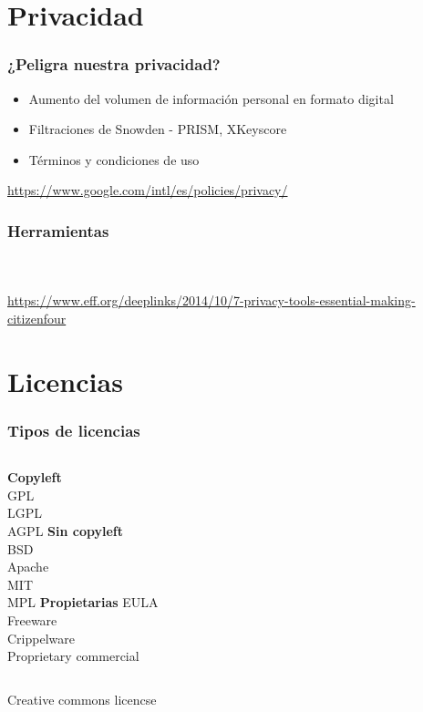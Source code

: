 \documentclass{beamer}
\begin{document}
\section{Privacidad}

\begin{frame}
\end{frame}

\begin{frame}\frametitle{¿Peligra nuestra privacidad?}
	\begin{itemize}
        \item Aumento del volumen de información personal en formato digital
		\item Filtraciones de Snowden - PRISM, XKeyscore
		\item Términos y condiciones de uso
	\end{itemize}

	        \url{https://www.google.com/intl/es/policies/privacy/}
\end{frame}

\begin{frame}\frametitle{Herramientas}

    \\~\\
    \url{https://www.eff.org/deeplinks/2014/10/7-privacy-tools-essential-making-citizenfour}
\end{frame}


\section{Licencias}

\begin{frame}\frametitle{Tipos de licencias}
    \begin{columns}[c]
    \textbf{Copyleft} \\
    GPL \\ LGPL \\ AGPL
    \textbf{Sin copyleft} \\
    BSD \\ Apache \\ MIT \\ MPL
    \textbf{Propietarias}
    EULA \\ Freeware \\ Crippelware \\ Proprietary commercial
    \end{columns}
    \begin{center}
        Creative commons licencse
    \end{center}
\end{frame}
\end{document}

